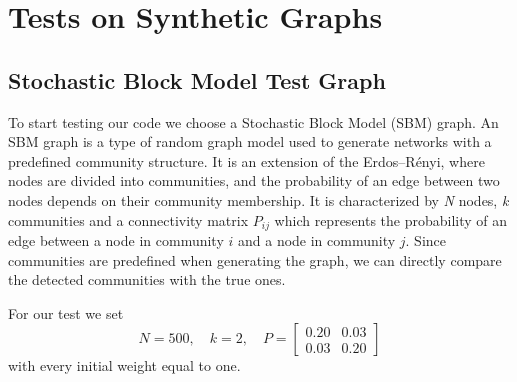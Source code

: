 \section{Tests on Synthetic Graphs}\label{sec5.2}
\subsection{Stochastic Block Model Test Graph}
To start testing our code we choose a Stochastic Block Model (SBM) graph. An SBM graph is a type of random graph model used to generate networks with a predefined community structure. It is an extension of the Erdos--R\'enyi, where nodes are divided into communities, and the probability of an edge between two nodes depends on their community membership. It is characterized by \textit{N} nodes, \textit{k} communities and a connectivity matrix \textit{$P_{ij}$} which represents the probability of an edge between a node in community $i$ and a node in community $j$.
Since communities are predefined when generating the graph, we can directly compare the detected communities with the true ones.

For our test we set 
\begin{equation*}
    N = 500, \quad k = 2, \quad
    P =
    \begin{bmatrix} 
        0.20 & 0.03 \\
        0.03 & 0.20
    \end{bmatrix}
\end{equation*}
with every initial weight equal to one.

